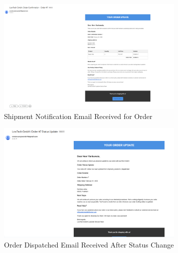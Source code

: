\documentclass{llncs}
\begin{document}
\begin{figure}[H]
    \centering
    \includegraphics[width=0.8\textwidth]{../images/Shipment_email.png}  %
    \vspace{3mm}  %
    \caption{Shipment Notification Email Received for Order}
    \label{fig:Webshop_9}
\end{figure}
\vspace{10mm}  %

\begin{figure}[H]
    \centering
    \includegraphics[width=0.8\textwidth]{../images/dispatched_email.png}  %
    \vspace{3mm}  %
    \caption{Order Dispatched Email Received After Status Change}
    \label{fig:Webshop_10}
\end{figure}
\vspace{10mm}  %
\end{document}
